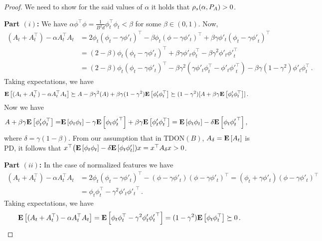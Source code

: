 \thtdadmis*
\begin{proof}
We need to show for the said values of $\alpha$ it holds that $\rho_s(\alpha,P_A)>0$. %

\textbf{Part $(i)$:}  We have $\alpha\phi^\top\phi=\frac{1}{B^2d}\phi^\top_t\phi_t<\beta$ for some $\beta\in (0,1)$. Now, 
\begin{align*}
(A_t+A_t^\top) -\alpha A_t^\top A_t 
& = 2\phi_t(\phi_t-\gamma\phi'_t)^\top -\beta\phi_t(\phi-\gamma\phi'_t)^\top+\beta\gamma\phi'_t(\phi_t-\gamma{\phi'}_t)^\top\\
&= (2-\beta)\phi_t(\phi_t-\gamma\phi'_t)^\top +\beta\gamma\phi'_t\phi^\top_t-\beta\gamma^2\phi'_t{\phi'}_t^\top \\
&= (2-\beta)\phi_t(\phi_t-\gamma\phi'_t)^\top -\beta\gamma^2(\gamma\phi'_t\phi^\top_t- \phi'_t{\phi'}_t^\top)-\beta\gamma(1-\gamma^2)\phi'_t\phi_t^\top\,.
\end{align*}
Taking expectations, we have 
\begin{align*}
\mathbf{E}\left[ (A_t+A_t^\top)-\alpha A_t^\top A_t\right] &\succeq  A -\beta\gamma^2(A)+\beta\gamma(1-\gamma^2)\mathbf{E}\left[\phi'_t\phi_t^\top\right]
\succeq (1-\gamma^2)[A +\beta\gamma\mathbf{E}\left[\phi'_t\phi_t^\top\right]]\,.
\end{align*}
Now we have 
\begin{align*}
A +\beta\gamma\mathbf{E}\left[\phi'_t\phi_t^\top\right]=& \mathbf{E}\left[\phi_t\phi_t\right]-\gamma\mathbf{E}\left[\phi_t{\phi'_t}^\top\right] +\beta\gamma\mathbf{E}\left[\phi'_t\phi_t^\top\right]
=\mathbf{E}\left[\phi_t\phi_t\right]-\delta\mathbf{E}\left[\phi_t{\phi'_t}^\top\right],
\end{align*}
where $\delta=\gamma(1-\beta)$. 
From our assumption that in $\text{TDON}(B)$, $A_{\delta}=\mathbf{E}\left[A_t\right]$ is PD,
it follows that $x^\top\big(\mathbf{E}\left[\phi_t\phi_t\right]-\delta\mathbf{E}\left[\phi_t\phi'_t\right] )x=x^\top A_{\delta} x>0$.

\textbf{Part $(ii)$:}
In the case of normalized features we have
\begin{align*}
(A_t+A_t^\top) -\alpha A_t^\top A_t 
&= 2\phi_t(\phi_t-\gamma\phi'_t)^\top - (\phi-\gamma\phi'_t)(\phi-\gamma\phi'_t)^\top
=(\phi_t+\gamma\phi'_t)(\phi-\gamma\phi'_t)^\top\\
&=\phi_t\phi_t^\top-\gamma^2\phi'_t{\phi'_t}^\top\,.
\end{align*}
Taking expectations, we have
\begin{align*}
\mathbf{E}\left[(A_t+A_t^\top) -\alpha A_t^\top A_t \right]=\mathbf{E}\left[\phi_t\phi_t^\top-\gamma^2\phi'_t{\phi'_t}^\top\right]
=(1-\gamma^2)\mathbf{E}\left[\phi_t\phi_t^\top\right]
\succeq 0\,.
\end{align*}


\end{proof}
